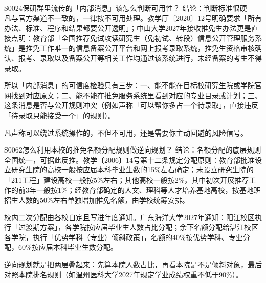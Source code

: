 \begin{qa}{S0024}{保研群里流传的「内部消息」该怎么判断可用性？}
结论：判断标准很硬——凡与官方渠道不一致的，一律按不可用处理。教学厅〔2020〕12号明确要求「所有办法、标准、程序和结果都要公开透明」；中山大学2027年接收推免生办法更是直接点明：教育部「全国推荐免试攻读研究生（免初试、转段）信息公开管理服务系统」是推免工作唯一的信息备案公开平台和网上报考录取系统，推免生资格审核确认、报考、录取以及备案公开等相关工作均通过该系统进行，未经备案的考生不得录取。

所以「内部消息」的可信度检验只有三步：一、能不能在目标校研究生院或学院官网找到对应原文；二、能不能在推免服务系统里看到对应的专业目录或计划；三、这条消息是否与公开规则冲突（例如声称「可以帮你多占一个待录取」，直接违反「待录取只能接受一个」的规则）。

凡声称可以绕过系统操作的，不但不可用，还是需要你主动回避的风险信号。
\end{qa}

\begin{qa}{S0062}{怎么利用本校的推免名额分配规则做逆向规划？}
结论：名额分配的底层规则全国统一，可据此反推。教学〔2006〕14号第十二条规定分配原则：教育部批准设立研究生院的高校一般按应届本科毕业生数的15\%左右确定；未设立研究生院的「211工程」建设高校一般按5\%左右；其他高校一般按2\%，其中初次开展推荐工作的前3年一般按1\%；经教育部确定的人文、理科等人才培养基地高校，按基地班招生人数的50\%左右单独增加推免名额，由学校统筹安排。

校内二次分配由各校自定且写进年度通知。广东海洋大学2027年通知：阳江校区执行「过渡期方案」，各学院按应届毕业生人数占比分配；余下名额分配给湛江校区各学院，执行「优势学科（专业）倾斜政策」，名额的40\%按优势学科、专业分配，60\%按应届本科毕业生数分配。

逆向规划就是把两层叠起来：先算本院人数占比，再看本院是不是倾斜对象，最后对照本院排名规则（如温州医科大学2027年规定学业成绩权重不低于90\%）。
\end{qa}

